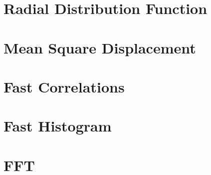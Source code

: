 \chapter{Radial Distribution Function}
\chapter{Mean Square Displacement}
\chapter{Fast Correlations}
\chapter{Fast Histogram}
\chapter{FFT}
